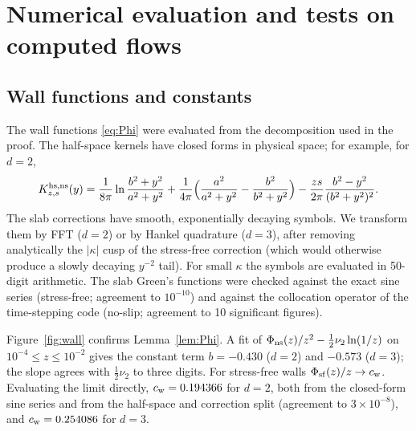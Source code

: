\section{Numerical evaluation and tests on computed flows}\label{sec:numerics}

\subsection{Wall functions and constants}
The wall functions \eqref{eq:Phi} were evaluated from the decomposition used in the proof. The half-space
kernels have closed forms in physical space; for example, for $d=2$,
\[
K^{\rm hs,ns}_{z,s}(y)=\frac1{8\pi}\ln\frac{b^2+y^2}{a^2+y^2}+\frac1{4\pi}\Big(\frac{a^2}{a^2+y^2}-\frac{b^2}{b^2+y^2}\Big)-\frac{zs}{2\pi}\frac{b^2-y^2}{(b^2+y^2)^2}.
\]
The slab corrections have smooth, exponentially decaying symbols. We transform them by FFT ($d=2$) or by Hankel
quadrature ($d=3$), after removing analytically the $|\kappa|$ cusp of the stress-free correction (which would
otherwise produce a slowly decaying $y^{-2}$ tail). For small $\kappa$ the symbols are evaluated in 50-digit
arithmetic. The slab Green's functions were checked against the exact sine series (stress-free; agreement to
$10^{-10}$) and against the collocation operator of the time-stepping code (no-slip; agreement to 10
significant figures).

Figure~\ref{fig:wall} confirms Lemma~\ref{lem:Phi}. A fit of $\Phi_{\rm ns}(z)/z^2-\frac12\nu_2\ln(1/z)$ on
$10^{-4}\le z\le10^{-2}$ gives the constant term $b=-0.430$ ($d=2$) and $-0.573$ ($d=3$); the slope agrees with
$\frac12\nu_2$ to three digits. For stress-free walls $\Phi_{\rm sf}(z)/z\to c_{\rm w}$. Evaluating the limit
directly, $c_{\rm w}=0.194366$ for $d=2$, both from the closed-form sine series and from the half-space and
correction split (agreement to $3\times10^{-8}$), and $c_{\rm w}=0.254086$ for $d=3$.

